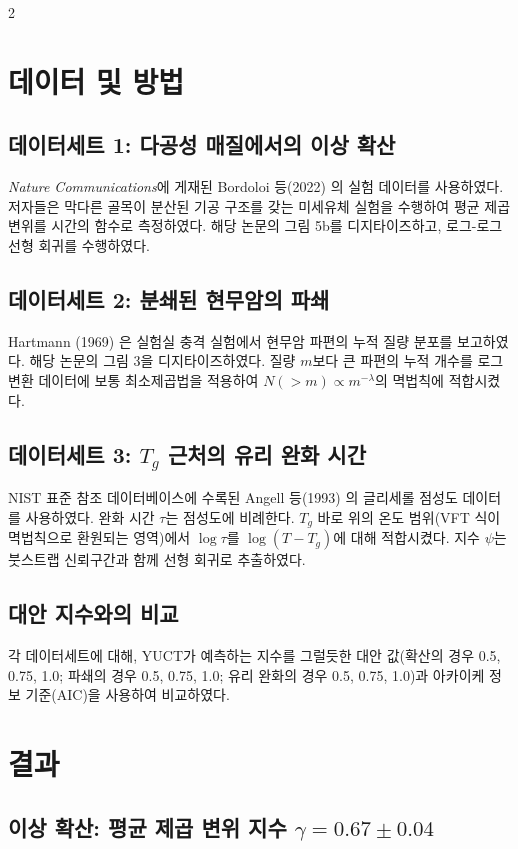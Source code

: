 \documentclass[11pt,a4paper]{article}
\begin{document}
\begin{multicols}{2}
		\section{데이터 및 방법}
		
		\subsection{데이터세트 1: 다공성 매질에서의 이상 확산}
		\emph{Nature Communications}에 게재된 Bordoloi 등(2022) \cite{Bordoloi2022}의 실험 데이터를 사용하였다. 저자들은 막다른 골목이 분산된 기공 구조를 갖는 미세유체 실험을 수행하여 평균 제곱 변위를 시간의 함수로 측정하였다. 해당 논문의 그림 5b를 디지타이즈하고, 로그-로그 선형 회귀를 수행하였다.
		
		\subsection{데이터세트 2: 분쇄된 현무암의 파쇄}
		Hartmann (1969) \cite{Hartmann1969}은 실험실 충격 실험에서 현무암 파편의 누적 질량 분포를 보고하였다. 해당 논문의 그림 3을 디지타이즈하였다. 질량 \(m\)보다 큰 파편의 누적 개수를 로그 변환 데이터에 보통 최소제곱법을 적용하여 \(N(>m) \propto m^{-\lambda}\)의 멱법칙에 적합시켰다.
		
		\subsection{데이터세트 3: \(T_g\) 근처의 유리 완화 시간}
		NIST 표준 참조 데이터베이스에 수록된 Angell 등(1993) \cite{Angell1993}의 글리세롤 점성도 데이터를 사용하였다. 완화 시간 \(\tau\)는 점성도에 비례한다. \(T_g\) 바로 위의 온도 범위(VFT 식이 멱법칙으로 환원되는 영역)에서 \(\log \tau\)를 \(\log(T - T_g)\)에 대해 적합시켰다. 지수 \(\psi\)는 붓스트랩 신뢰구간과 함께 선형 회귀로 추출하였다.
		
		\subsection{대안 지수와의 비교}
		각 데이터세트에 대해, YUCT가 예측하는 지수를 그럴듯한 대안 값(확산의 경우 0.5, 0.75, 1.0; 파쇄의 경우 0.5, 0.75, 1.0; 유리 완화의 경우 0.5, 0.75, 1.0)과 아카이케 정보 기준(AIC)을 사용하여 비교하였다.
		
		\section{결과}
		
		\subsection{이상 확산: 평균 제곱 변위 지수 \(\gamma = 0.67 \pm 0.04\)}
		

\end{multicols}
\end{document}
